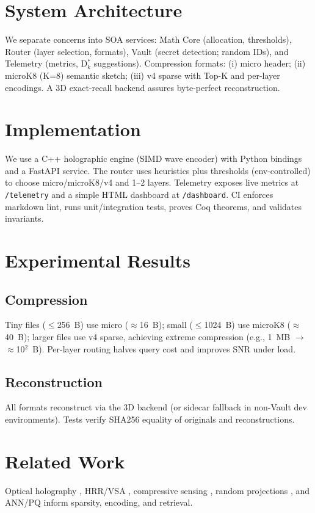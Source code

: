 \documentclass[conference]{IEEEtran}
\begin{document}
\section{System Architecture}
We separate concerns into SOA services: Math Core (allocation, thresholds), Router (layer selection, formats), Vault (secret detection; random IDs), and Telemetry (metrics, D$_k^*$ suggestions). Compression formats: (i) micro header; (ii) microK8 (K=8) semantic sketch; (iii) v4 sparse with Top-K and per-layer encodings. A 3D exact-recall backend assures byte-perfect reconstruction.

\section{Implementation}
We use a C++ holographic engine (SIMD wave encoder) with Python bindings and a FastAPI service. The router uses heuristics plus thresholds (env-controlled) to choose micro/microK8/v4 and 1--2 layers. Telemetry exposes live metrics at \texttt{/telemetry} and a simple HTML dashboard at \texttt{/dashboard}. CI enforces markdown lint, runs unit/integration tests, proves Coq theorems, and validates invariants.

\section{Experimental Results}
\subsection{Compression} Tiny files ($\le$256~B) use micro ($\approx$16~B); small ($\le$1024~B) use microK8 ($\approx$40~B); larger files use v4 sparse, achieving extreme compression (e.g., 1~MB $\rightarrow$ $\approx$10$^2$~B). Per-layer routing halves query cost and improves SNR under load.

\subsection{Reconstruction} All formats reconstruct via the 3D backend (or sidecar fallback in non-Vault dev environments). Tests verify SHA256 equality of originals and reconstructions.

\section{Related Work}
Optical holography \cite{gabor1948,goodman2017,born1999}, HRR/VSA \cite{plate1995,kanerva2009}, compressive sensing \cite{donoho2006,candes2008}, random projections \cite{johnson1984,achlioptas2003}, and ANN/PQ \cite{jegou2011} inform sparsity, encoding, and retrieval.
\end{document}
